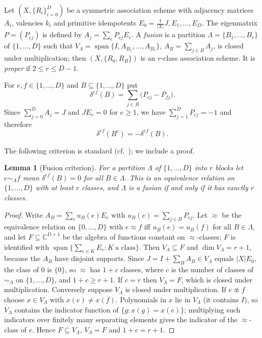 \documentclass[11pt]{article}
\newtheorem{lemma}[theorem]{Lemma}
\theoremstyle{remark}
\newcommand{\C}{\mathbb{C}}
\begin{document}
Let $(X,\{R_i\}_{i=0}^D)$ be a symmetric association scheme with adjacency matrices $A_i$, valencies $k_i$ and primitive idempotents $E_0=\tfrac1{|X|}J,E_1,\dots,E_D$. The eigenmatrix $P=(P_{ej})$ is defined by $A_j=\sum_e P_{ej}E_e$. A \emph{fusion} is a partition $\Lambda=\{B_1,\dots,B_r\}$ of $\{1,\dots,D\}$ such that $V_\Lambda=\operatorname{span}\{I,A_{B_1},\dots,A_{B_r}\}$, $A_B=\sum_{j\in B}A_j$, is closed under multiplication; then $(X,\{R_0,R_B\})$ is an $r$-class association scheme. It is \emph{proper} if $2\le r\le D-1$.

For $e,f\in\{1,\dots,D\}$ and $B\subseteq\{1,\dots,D\}$ put
\[
\delta^{ef}(B)=\sum_{j\in B}\bigl(P_{ej}-P_{fj}\bigr).
\]
Since $\sum_{j=0}^DA_j=J$ and $JE_e=0$ for $e\ge1$, we have $\sum_{j=1}^DP_{ej}=-1$ and therefore
\begin{equation}\label{eq:compl}
\delta^{ef}(B^c)=-\delta^{ef}(B).
\end{equation}

The following criterion is standard (cf.~\cite{BI}); we include a proof.\begin{lemma}[Fusion criterion]\label{lem:crit}
For a partition $\Lambda$ of $\{1,\dots,D\}$ into $r$ blocks let $e\sim_\Lambda f$ mean $\delta^{ef}(B)=0$ for all $B\in\Lambda$. This is an equivalence relation on $\{1,\dots,D\}$ with at least $r$ classes, and $\Lambda$ is a fusion if and only if it has exactly $r$ classes.
\end{lemma}
\begin{proof}
Write $A_B=\sum_e u_B(e)E_e$ with $u_B(e)=\sum_{j\in B}P_{ej}$. Let $\approx$ be the equivalence relation on $\{0,\dots,D\}$ with $e\approx f$ iff $u_B(e)=u_B(f)$ for all $B\in\Lambda$, and let $F\subseteq\C^{D+1}$ be the algebra of functions constant on $\approx$-classes; $F$ is identified with $\operatorname{span}\{\sum_{e\in K}E_e: K\ \text{a class}\}$. Then $V_\Lambda\subseteq F$ and $\dim V_\Lambda=r+1$, because the $A_B$ have disjoint supports. Since $J=I+\sum_BA_B\in V_\Lambda$ equals $|X|E_0$, the class of $0$ is $\{0\}$, so $\approx$ has $1+c$ classes, where $c$ is the number of classes of $\sim_\Lambda$ on $\{1,\dots,D\}$, and $1+c\ge r+1$.
If $c=r$ then $V_\Lambda=F$, which is closed under multiplication. Conversely suppose $V_\Lambda$ is closed under multiplication. If $e\not\approx f$ choose $x\in V_\Lambda$ with $x(e)\ne x(f)$. Polynomials in $x$ lie in $V_\Lambda$ (it contains $I$), so $V_\Lambda$ contains the indicator function of $\{g:x(g)=x(e)\}$; multiplying such indicators over finitely many separating elements gives the indicator of the $\approx$-class of $e$. Hence $F\subseteq V_\Lambda$, $V_\Lambda=F$ and $1+c=r+1$.
\end{proof}
\end{document}
